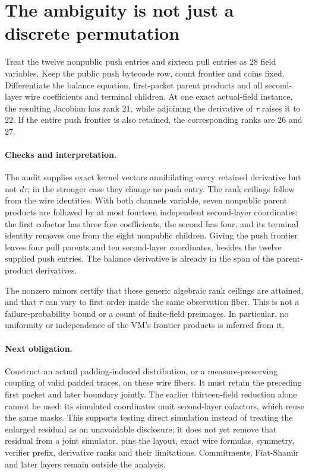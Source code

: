 \documentclass[11pt]{article}
\begin{document}
\section{The ambiguity is not just a discrete permutation}

Treat the twelve nonpublic push entries and sixteen pull entries as $28$ field variables. Keep the public push bytecode row, count frontier and coins fixed. Differentiate the balance equation, first-packet parent products and all second-layer wire coefficients and terminal children. At one exact actual-field instance, the resulting Jacobian has rank $21$, while adjoining the derivative of $\tau$ raises it to $22$. If the entire push frontier is also retained, the corresponding ranks are $26$ and $27$.

\paragraph{Checks and interpretation.} The audit supplies exact kernel vectors annihilating every retained derivative but not $d\tau$; in the stronger case they change no push entry. The rank ceilings follow from the wire identities. With both channels variable, seven nonpublic parent products are followed by at most fourteen independent second-layer coordinates: the first cofactor has three free coefficients, the second has four, and its terminal identity removes one from the eight nonpublic children. Giving the push frontier leaves four pull parents and ten second-layer coordinates, besides the twelve supplied push entries. The balance derivative is already in the span of the parent-product derivatives.

The nonzero minors certify that these generic algebraic rank ceilings are attained, and that $\tau$ can vary to first order inside the same observation fiber. This is not a failure-probability bound or a count of finite-field preimages. In particular, no uniformity or independence of the VM's frontier products is inferred from it.

\paragraph{Next obligation.} Construct an actual padding-induced distribution, or a measure-preserving coupling of valid padded traces, on these wire fibers. It must retain the preceding first packet and later boundary jointly. The earlier thirteen-field reduction alone cannot be used: its simulated coordinates omit second-layer cofactors, which reuse the same masks. This supports testing direct simulation instead of treating the enlarged residual as an unavoidable disclosure; it does not yet remove that residual from a joint simulator.  pins the layout, exact wire formulas, symmetry, verifier prefix, derivative ranks and their limitations. Commitments, Fiat-Shamir and later layers remain outside the analysis.
\end{document}
